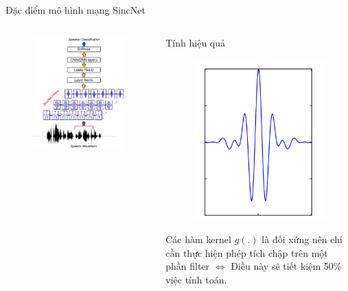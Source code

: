 \documentclass[notheorems, aspectratio=54]{beamer}
\begin{document}
\begin{frame}{Đặc điểm mô hình mạng SincNet}
	\begin{columns}
		\begin{column}{0.47\textwidth}
			\begin{figure}[H]
				\includegraphics[width=0.9\linewidth]{images/SincNet.png}
			\end{figure}
		\end{column}
		\begin{column}{0.5\textwidth}
			Tính hiệu quả
			\begin{figure}[H]
				\includegraphics[width=0.35\linewidth]{images/g_symmetric.png}
			\end{figure}
			Các hàm kernel $g(.)$ là đối xứng nên chỉ cần thực hiện phép tích chập trên một phần filter $\Leftrightarrow$ Điều này sẽ tiết kiệm 50\% việc tính toán.
		\end{column}
	\end{columns}
\end{frame}
\end{document}
